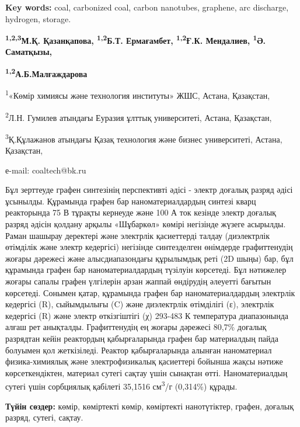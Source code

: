 {\bfseries Key words:} coal, carbonized coal, carbon nanotubes, graphene,
arc discharge, hydrogen, storage.


\begin{center}
{\bfseries \textsuperscript{1,2,3}М.Қ. Қазанқапова,
\textsuperscript{1,2}Б.Т. Ермағамбет, \textsuperscript{1,2}Ғ.К.
Мендалиев, \textsuperscript{1}Ә. Саматқызы,}

{\bfseries \textsuperscript{1,2}А.Б.Малғаждарова}

\textsuperscript{1}«Көмір химиясы және технология институты» ЖШС,
Астана, Қазақстан,

\textsuperscript{2}Л.Н. Гумилев атындағы Еуразия ұлттық университеті,
Астана, Қазақстан,

\textsuperscript{3}Қ.Құлажанов атындағы Қазақ технология және бизнес
университеті, Астана, Қазақстан,

е-mail: coaltech@bk.ru
\end{center}

Бұл зерттеуде графен синтезінің перспективті әдісі - электр доғалық
разряд әдісі ұсынылды. Құрамында графен бар наноматериалдардың синтезі
кварц реакторында 75 В тұрақты кернеуде және 100 А ток кезінде электр
доғалық разряд әдісін қолдану арқылы «Шұбаркөл» көмірі негізінде жүзеге
асырылды. Раман шашырау деректері және электрлік қасиеттерді талдау
(диэлектрлік өтімділік және электр кедергісі) негізінде синтезделген
өнімдерде графиттенудің жоғары дәрежесі және алысдиапазондағы құрылымдық
реті (2D шыңы) бар, бұл құрамында графен бар наноматериалдардың түзілуін
көрсетеді. Бұл нәтижелер жоғары сапалы графен үлгілерін арзан жаппай
өндірудің әлеуетті бағытын көрсетеді. Сонымен қатар, құрамында графен
бар наноматериалдардың электрлік кедергісі (R), сыйымдылығы (C) және
диэлектрлік өтімділігі (ε), электрлік кедергісі (R) және электр
өткізгіштігі (χ) 293-483 К температура диапазонында алғаш рет анықталды.
Графиттенудің ең жоғары дәрежесі 80,7\% доғалық разрядтан кейін
реактордың қабырғаларында графен бар материалдың пайда болуымен қол
жеткізіледі. Реактор қабырғаларында алынған наноматериал физика-химиялық
және электрофизикалық қасиеттері бойынша жақсы нәтиже көрсеткендіктен,
материал сутегі сақтау үшін сынақтан өтті. Наноматериалдың сутегі үшін
сорбциялық қабілеті 35,1516 см\textsuperscript{3}/г (0,314\%) құрады.

{\bfseries Түйін сөздер:} көмір, көміртекті көмір, көміртекті нанотүтіктер,
графен, доғалық разряд, сутегі, сақтау.


